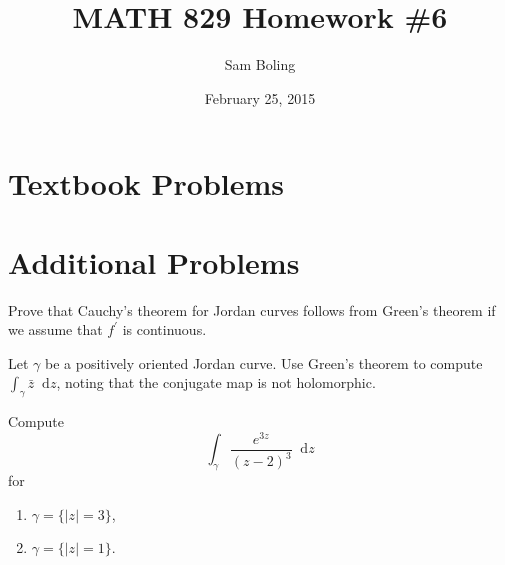 \documentclass{article}
\title{MATH 829 Homework \#6}
\date{February 25, 2015}
\author{Sam Boling}
\newcommand\dif{\mathop{}\!\mathrm{d}}
\newcounter{Problem}
\newenvironment{Problem}{\begin{Exercise}[name={Problem},
                                          counter={Problem}]}
                        {\end{Exercise}}
\begin{document}
\begin{titlepage}
\maketitle
\end{titlepage}

\section{Textbook Problems}

\section{Additional Problems}
\begin{Problem}
Prove that Cauchy's theorem for Jordan curves follows from
Green's theorem if we assume that $f^\prime$ is continuous.
\end{Problem}

\begin{Answer}
\end{Answer}

\begin{Problem}
Let $\gamma$ be a positively oriented Jordan curve. Use
Green's theorem to compute $\int_\gamma \bar{z} \dif z$,
noting that the conjugate map is not holomorphic.
\end{Problem}

\begin{Problem}
Compute
$$
\int_\gamma \frac{e^{3z}}{(z - 2)^3} \dif z
$$
for
\begin{enumerate}[label=(\alph*)]
  \item{
    $\gamma = \{ |z| = 3 \}$,
  }
  \item{
    $\gamma = \{ |z| = 1 \}$.
  }
\end{enumerate}
\end{Problem}
\end{document}

